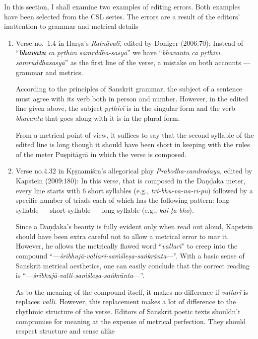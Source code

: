 In this section, I shall examine two examples of editing errors. Both examples have been selected from the CSL series. The errors are a result of the editors’ inattention to grammar and metrical details
\begin{enumerate}
\item Verse no.\ 1.4 in Harṣa’s \textsl{Ratnāvalī},
 edited by Doniger (2006:70): Instead of “{\sl\bfseries bhavatu} \textsl{ca pṛthivī samṛddha-sasyā}” we have “\textsl{bhavantu} \textsl{ca pṛthivī samrūddhasasyā}” as the first line of the verse, a mistake on both accounts --- grammar and metrics. 

According to the principles of Sanskrit grammar, the subject of a sentence must agree with its verb both in person and number. However, in the edited line given above, the subject \textsl{pṛthivī} is in the singular form and the verb \textsl{bhavantu} that goes along with it is in the plural form. 

From a metrical point of view, it suffices to say that the second syllable of the edited line is long though it should have been short in keeping with the rules of the meter Puṣpitāgrā in which the verse is composed.  

\item Verse no.\@ 4.32 in Kṛṣnamiśra’s allegorical play \textsl{Prabodha-candrodaya}, edited by Kapstein (2009:180):  In this verse, that is composed in the Daṇḍaka meter, every line starts with 6 short syllables (e.g., \textsl{tri-bhu-va-na-ri-pu}) followed by a specific number of triads each of which has the following pattern: long syllable --- short syllable --- long syllable (e.g., \textsl{kai-ṭa-bho}). 

Since a Daṇḍaka’s beauty is fully evident only when read out aloud, Kapstein should have been extra careful not to allow a metrical error to mar it. However, he allows the metrically flawed word “\textsl{vallarī}” to creep into the compound “---\textsl{śrībhujā-}\textsl{vallarī-}\textsl{saṁśleṣa-saṅkrānta}—”. With a basic sense of Sanskrit metrical aesthetics, one can easily conclude that the correct reading is “---\textsl{śrībhujā-}\textsl{valli-}\textsl{saṁśleṣa-saṅkrānta}—”. 

As to the meaning of the compound itself, it makes no difference if \textsl{vallarī} is replaces \textsl{valli}. However, this replacement makes a lot of difference to the rhythmic structure of the verse. Editors of Sanskrit poetic texts shouldn’t compromise for meaning at the expense of metrical perfection. They should respect structure and sense alike
\end{enumerate}
